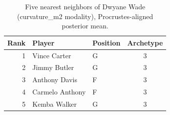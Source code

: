 \begin{table}[htbp]
  \centering\small
  \begin{tabular}{rllc}
    \toprule
    Rank & Player & Position & Archetype \\
    \midrule
    1 & Vince Carter & G & 3 \\
    2 & Jimmy Butler & G & 3 \\
    3 & Anthony Davis & F & 3 \\
    4 & Carmelo Anthony & F & 3 \\
    5 & Kemba Walker & G & 3 \\
    \bottomrule
  \end{tabular}
  \caption{Five nearest neighbors of Dwyane Wade (curvature_m2 modality), Procrustes-aligned posterior mean.}
  \label{tab:Dwyane_Wade_neighbors_curvature_m2}
\end{table}

